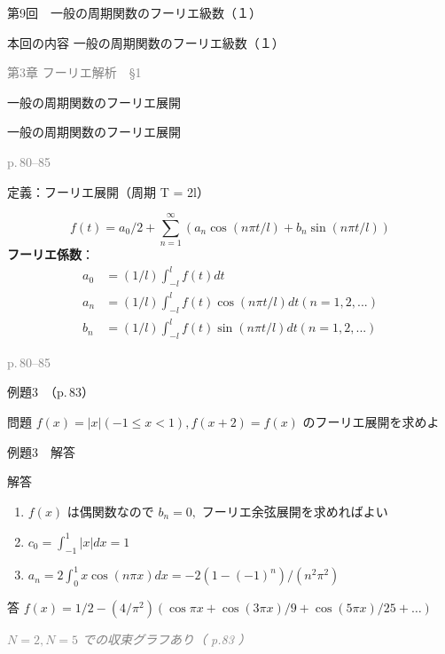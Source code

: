 \documentclass[aspectratio=43,professionalfonts,handout]{beamer}
\begin{document}
\begin{frame}{第9回　一般の周期関数のフーリエ級数（１）}
  \begin{block}{本回の内容}
  一般の周期関数のフーリエ級数（１）
  \end{block}
  \vfill\hfill{\scriptsize \textcolor{gray}{第3章 フーリエ解析　§1}}
\end{frame}

\begin{frame}{一般の周期関数のフーリエ展開}
  \begin{block}{}
  {\large 一般の周期関数のフーリエ展開}
  \end{block}
  \vfill\hfill{\scriptsize \textcolor{gray}{p.\,80--85}}
\end{frame}

\begin{frame}{定義：フーリエ展開（周期 T = 2l）}
  \begin{block}{}
  \[
    f(t) = a_{0}/2 + \sum_{n=1}^\infty (a_{n}\cos(n\pi t/l) + b_{n}\sin(n\pi t/l))
  \]
  \medskip\textbf{フーリエ係数}：
  \begin{align*}
    a_{0} &= (1/l) \int_{-l}^{l} f(t) dt \\
    a_{n} &= (1/l) \int_{-l}^{l} f(t)\cos(n\pi t/l) dt  (n = 1, 2, ...) \\
    b_{n} &= (1/l) \int_{-l}^{l} f(t)\sin(n\pi t/l) dt  (n = 1, 2, ...)
  \end{align*}
  \end{block}
  \vfill\hfill{\scriptsize \textcolor{gray}{p.\,80--85}}
\end{frame}

\begin{frame}{例題3　（p.\,83）}
  \begin{exampleblock}{問題}
    $f(x) = |x| (-1 \leq x < 1), f(x+2) = f(x)$ のフーリエ展開を求めよ\\[2pt]
  \end{exampleblock}
\end{frame}

\begin{frame}{例題3　解答}
  \begin{exampleblock}{解答}
  \begin{enumerate}[1.]
    \item[] $f(x)$ は偶関数なので $b_{n} = 0,$ フーリエ余弦展開を求めればよい
    \item[] $c_{0} = \int_{-1}^{1} |x| dx = 1$
    \item[] $a_{n} = 2\int_{0}^{1} x \cos(n\pi x) dx = -2(1-(-1)^n)/(n^{2}\pi^{2})$
  \end{enumerate}
  \end{exampleblock}
  \begin{alertblock}{答}
    $f(x) = 1/2 - (4/\pi^{2})(\cos \pi x + \cos(3\pi x)/9 + \cos(5\pi x)/25 + \ldots)$
  \end{alertblock}
  {\footnotesize \textcolor{gray}{\textit{$N=2, N=5$ での収束グラフあり（ p.83 ）}}}
\end{frame}
\end{document}

